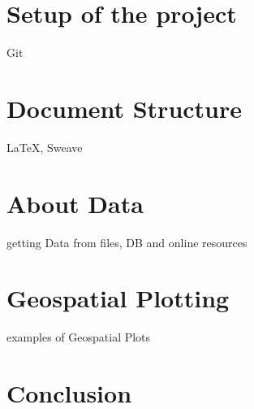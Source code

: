 \documentclass{ifacconf}
\begin{document}
\section{Setup of the project}

Git

\section{Document Structure}

LaTeX, Sweave

\section{About Data}

getting Data from files, DB and online resources


\section{Geospatial Plotting}

examples of Geospatial Plots

\section{Conclusion}



            
\end{document}
